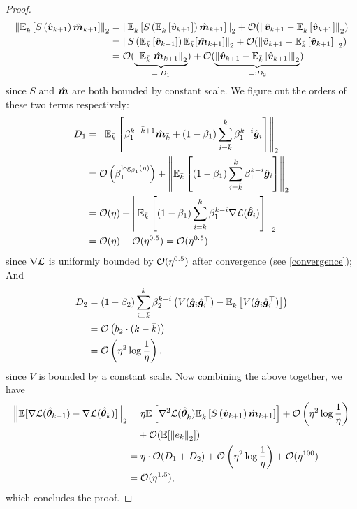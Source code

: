 \begin{proof}
\begin{align*}
        \left\|\mathbb{E}_{\Bar{k}}\left[S\left(\hat{{\bm{v}}}_{k+1}\right) \hat{{\bm{m}}}_{k+1}\right]\right\|_2 &= \left\|\mathbb{E}_{\Bar{k}}\left[S\left(\mathbb{E}_{\Bar{k}}\left[\hat{{\bm{v}}}_{k+1}\right]\right) \hat{{\bm{m}}}_{k+1}\right]\right\|_2 + \mathcal{O}(\left\|\hat{{\bm{v}}}_{k+1} - \mathbb{E}_{\Bar{k}}\left[\hat{{\bm{v}}}_{k+1}\right]\right\|_2) \\
        &= \left\|S\left(\mathbb{E}_{\Bar{k}}\left[\hat{{\bm{v}}}_{k+1}\right]\right) \mathbb{E}_{\Bar{k}}[\hat{{\bm{m}}}_{k+1}]\right\|_2 + \mathcal{O}(\left\|\hat{{\bm{v}}}_{k+1} - \mathbb{E}_{\Bar{k}}\left[\hat{{\bm{v}}}_{k+1}\right]\right\|_2) \\
        &= \mathcal{O}(\underbrace{\left\|\mathbb{E}_{\Bar{k}}[\hat{{\bm{m}}}_{k+1}\right\|_2}_{=:D_1}) + \mathcal{O}(\underbrace{\left\|\hat{{\bm{v}}}_{k+1} - \mathbb{E}_{\Bar{k}}\left[\hat{{\bm{v}}}_{k+1}\right]\right\|_2}_{=:D_2})
    \end{align*}
    since $S$ and $\hat{{\bm{m}}}$ are both bounded by constant scale. We figure out the orders of these two terms respectively: \begin{align*}
        D_1 &= \left\|\mathbb{E}_{\Bar{k}}\left[\beta_1^{k-\Bar{k}+1}\hat{{\bm{m}}}_{\Bar{k}} + (1-\beta_1)\sum_{i=\Bar{k}}^{k}\beta_1^{k-i}\hat{{\bm{g}}}_i\right]\right\|_2 \\
        &= \mathcal{O}\left(\beta_1^{\log_{\beta_1}(\eta)}\right) + \left\|\mathbb{E}_{\Bar{k}}\left[(1-\beta_1)\sum_{i=\Bar{k}}^{k}\beta_1^{k-i}\hat{{\bm{g}}}_i\right]\right\|_2 \\
        &= \mathcal{O}(\eta) + \left\|\mathbb{E}_{\Bar{k}}\left[(1-\beta_1)\sum_{i=\Bar{k}}^{k}\beta_1^{k-i}\nabla \mathcal{L}(\hat{{\bm{\theta}}}_i)\right]\right\|_2 \\
        &= \mathcal{O}(\eta) + \mathcal{O}(\eta^{0.5}) = \mathcal{O}(\eta^{0.5})
    \end{align*}
    since $\nabla \mathcal{L}$ is uniformly bounded by $\mathcal{O}(\eta^{0.5})$ after convergence (see \cref{convergence}); And \begin{align*}
        D_2 &= (1-\beta_2)\sum_{i=\Bar{k}}^{k}\beta_2^{k-i}\left(V(\hat{{\bm{g}}}_i\hat{{\bm{g}}}_i^\top) - \mathbb{E}_{\Bar{k}}\left[V(\hat{{\bm{g}}}_i\hat{{\bm{g}}}_i^\top)\right]\right) \\
        &= \mathcal{O}\left(b_2 \cdot (k - \Bar{k})\right) \\
        &= \mathcal{O}\left(\eta^2 \log \frac{1}{\eta}\right),
    \end{align*}
    since $V$ is bounded by a constant scale. Now combining the above together, we have \begin{align*}
        \left\|\mathbb{E}[\nabla\mathcal{L}(\hat{{\bm{\theta}}}_{k+1}) - \nabla\mathcal{L}(\hat{{\bm{\theta}}}_k)]\right\|_2 &= \eta\mathbb{E}\left[\nabla^2 \mathcal{L} (\hat{{\bm{\theta}}}_{\Bar{k}}) \mathbb{E}_{\Bar{k}}\left[S\left(\hat{{\bm{v}}}_{k+1}\right) \hat{{\bm{m}}}_{k+1}\right]\right] + \mathcal{O}\left(\eta^2 \log \frac{1}{\eta}\right) \\
        & \quad + \mathcal{O}(\mathbb{E}[ \left\|e_{k}\right\|_2]) \\
        &= \eta \cdot \mathcal{O}(D_1 + D_2) + \mathcal{O}\left(\eta^2 \log \frac{1}{\eta}\right) + \mathcal{O}(\eta^{100}) \\
        &= \mathcal{O}(\eta^{1.5}),
    \end{align*}
    which concludes the proof.
\end{proof}
